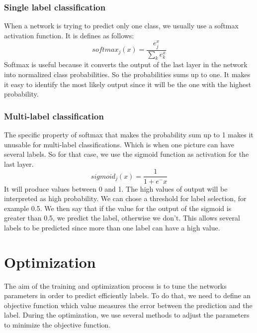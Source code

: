 \subsubsection{Single label classification}
When a network is trying to predict only one class, we usually use a softmax activation function. It is defines as follows: \[softmax_j(x) = \frac{e^x_j}{\sum\nolimits_{k} e^x_k} \]Softmax is useful because it converts the output of the last layer in the network into normalized class probabilities. So the probabilities sums up to one. It makes it easy to identify the most likely output since it will be the one with the highest probability. 
\subsubsection{Multi-label classification}
The specific property of softmax that makes the probability sum up to 1 makes it unusable for multi-label classifications. Which is when one picture can have several labels. So for that case, we use the sigmoid function as activation for the last layer.\[sigmoid_j(x) = \frac{1}{1 + e^-x} \] It will produce values between 0 and 1. The high values of output will be interpreted as high probability. We can chose a threshold for label selection, for example 0.5. We then say that if the value for the output of the sigmoid is greater than 0.5, we predict the label, otherwise we don't. This allows several labels to be predicted since more than one label can have a high value. 

\section{Optimization}
The aim of the training and optimization process is to tune the networks parameters in order to predict efficiently labels. To do that, we need to define an objective function which value measures the error between the prediction and the label. During the optimization, we use several methods to adjust the parameters to minimize the objective function.

